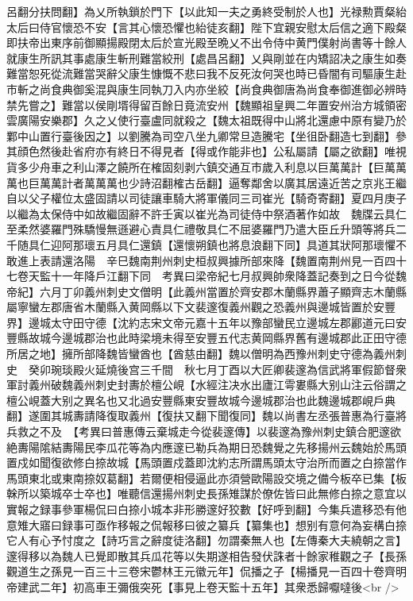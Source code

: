 呂翻分扶問翻】為乂所執鎖於門下【以此知一夫之勇終受制於人也】光禄勲賈粲紿太后曰侍官懷恐不安【言其心懷恐懼也紿徒亥翻】陛下宜親安慰太后信之適下殿粲即扶帝出東序前御顯揚殿閉太后於宣光殿至晩乂不出令侍中黄門僕射尚書等十餘人就康生所訊其事處康生斬刑難當絞刑【處昌呂翻】乂與剛並在内矯詔决之康生如奏難當恕死從流難當哭辭父康生慷慨不悲曰我不反死汝何哭也時已昏闇有司驅康生赴市斬之尚食典御奚混與康生同執刀入内亦坐絞【尚食典御唐為尚食奉御進御必辨時禁先嘗之】難當以侯剛壻得留百餘日竟流安州【魏顯祖皇興二年置安州治方城領密雲廣陽安樂郡】久之乂使行臺盧同就殺之【魏太祖既得中山將北還慮中原有變乃於鄴中山置行臺後因之】以劉騰為司空八坐九卿常旦造騰宅【坐徂卧翻造七到翻】參其顔色然後赴省府亦有終日不得見者【得或作能非也】公私屬請【屬之欲翻】唯視貨多少舟車之利山澤之饒所在榷固刻剥六鎮交通互市歲入利息以巨萬萬計【巨萬萬萬也巨萬萬計者萬萬萬也少詩沼翻榷古岳翻】逼奪鄰舍以廣其居遠近苦之京兆王繼自以父子權位太盛固請以司徒讓車騎大將軍儀同三司崔光【騎奇寄翻】夏四月庚子以繼為太保侍中如故繼固辭不許壬寅以崔光為司徒侍中祭酒著作如故　魏牒云具仁至柔然婆羅門殊驕慢無遜避心責具仁禮敬具仁不屈婆羅門乃遣大臣丘升頭等將兵二千随具仁迎阿那瓌五月具仁還鎮【還懷朔鎮也將息浪翻下同】具道其狀阿那瓌懼不敢進上表請還洛陽　辛巳魏南荆州刺史桓叔興據所部來降【魏置南荆州見一百四十七卷天監十一年降戶江翻下同　考異曰梁帝紀七月叔興帥衆降蓋記奏到之日今從魏帝紀】六月丁卯義州刺史文僧明【此義州當置於齊安郡木蘭縣界蕭子顯齊志木蘭縣屬寧蠻左郡唐省木蘭縣入黄岡縣以下文裴邃復義州觀之恐義州與邊城皆置於安豐界】邊城太守田守德【沈約志宋文帝元嘉十五年以豫部蠻民立邊城左郡酈道元曰安豐縣故城今邊城郡治也此時梁境未得至安豐五代志黄岡縣界舊有邊城郡此正田守德所居之地】擁所部降魏皆蠻酋也【酋慈由翻】魏以僧明為西豫州刺史守德為義州刺史　癸卯琬琰殿火延燒後宫三千間　秋七月丁酉以大匠卿裴邃為信武將軍假節督衆軍討義州破魏義州刺史封夀於檀公峴【水經注决水出廬江雩婁縣大别山注云俗謂之檀公峴蓋大别之異名也又北過安豐縣東安豐故城今邊城郡治也此魏邊城郡峴戶典翻】遂圍其城夀請降復取義州【復扶又翻下聞復同】魏以尚書左丞張普惠為行臺將兵救之不及　【考異曰普惠傳云棄城走今從裴邃傳】以裴邃為豫州刺史鎮合肥邃欲絶夀陽隂結夀陽民李瓜花等為内應邃已勒兵為期日恐魏覺之先移揚州云魏始於馬頭置戍如聞復欲修白捺故城【馬頭置戍蓋即沈約志所謂馬頭太守治所而置之白捺當作馬頭東北或東南捺奴葛翻】若爾便相侵逼此亦須營歐陽設交境之備今板卒已集【板榦所以築城卒士卒也】唯聽信還揚州刺史長孫雉謀於僚佐皆曰此無修白捺之意宜以實報之録事參軍楊侃曰白捺小城本非形勝邃好狡數【好呼到翻】今集兵遣移恐有他意雉大寤曰録事可亟作移報之侃報移曰彼之纂兵【纂集也】想别有意何為妄構白捺它人有心予忖度之【詩巧言之辭度徒洛翻】勿謂秦無人也【左傳秦大夫繞朝之言】邃得移以為魏人已覺即散其兵瓜花等以失期遂相告發伏誅者十餘家稚觀之子【長孫觀道生之孫見一百三十三卷宋鬱林王元徽元年】侃播之子【楊播見一百四十卷齊明帝建武二年】初高車王彌俄突死【事見上卷天監十五年】其衆悉歸嚈噠後<br />
